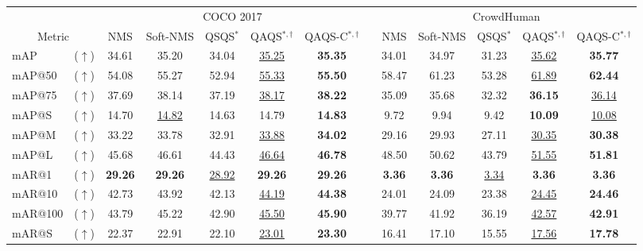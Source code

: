 \begin{table*}
    \centering
    \begin{tabular}{l r ccccc c ccccc}
    \toprule
     & & \multicolumn{5}{c}{COCO 2017}& & \multicolumn{5}{c}{CrowdHuman} \\
    \cmidrule(lr){3-7}
    \cmidrule(lr){9-13}
    \multicolumn{2}{c}{Metric} & NMS & Soft-NMS & QSQS$^{*}$ & QAQS$^{*,\dag}$ & QAQS-C$^{*,\dag}$ && NMS & Soft-NMS & QSQS$^{*}$ & QAQS$^{*,\dag}$ & QAQS-C$^{*,\dag}$ \\
    \cmidrule(lr){1-2}
    \cmidrule(lr){3-7}
    \cmidrule(lr){9-13}
    mAP        & ($\uparrow$) & 34.61 & 35.20 & 34.04 & \underline{35.25} & \textbf{35.35} && 34.01 & 34.97 & 31.23 & \underline{35.62} & \textbf{35.77} \\
    mAP@50     & ($\uparrow$) & 54.08 & 55.27 & 52.94 & \underline{55.33} & \textbf{55.50} && 58.47 & 61.23 & 53.28 & \underline{61.89} & \textbf{62.44} \\
    mAP@75     & ($\uparrow$) & 37.69 & 38.14 & 37.19 & \underline{38.17} & \textbf{38.22}& & 35.09 & 35.68 & 32.32 & \textbf{36.15} & \underline{36.14} \\
    mAP@S  & ($\uparrow$)     & 14.70 & \underline{14.82} & 14.63 & 14.79 & \textbf{14.83} &&  9.72 &  9.94 &  9.42 & \textbf{10.09} & \underline{10.08} \\
    mAP@M & ($\uparrow$)      & 33.22 & 33.78 & 32.91 & \underline{33.88} & \textbf{34.02} && 29.16 & 29.93 & 27.11 & \underline{30.35} & \textbf{30.38} \\
    mAP@L  & ($\uparrow$)     & 45.68 & 46.61 & 44.43 & \underline{46.64} & \textbf{46.78} && 48.50 & 50.62 & 43.79 & \underline{51.55} & \textbf{51.81} \\
    \cmidrule(lr){1-2}
    \cmidrule(lr){3-7}
    \cmidrule(lr){9-13}
    mAR@1      & ($\uparrow$) & \textbf{29.26} & \textbf{29.26} & \underline{28.92} & \textbf{29.26} & \textbf{29.26} &  &\textbf{3.36} &  \textbf{3.36} &  \underline{3.34} &  \textbf{3.36} & \textbf{ 3.36} \\
    mAR@10     & ($\uparrow$) & 42.73 & 43.92 & 42.13 & \underline{44.19} & \textbf{44.38} && 24.01 & 24.09 & 23.38 & \underline{24.45} & \textbf{24.46} \\
    mAR@100    & ($\uparrow$) & 43.79 & 45.22 & 42.90 & \underline{45.50} & \textbf{45.90} && 39.77 & 41.92 & 36.19 & \underline{42.57} & \textbf{42.91} \\
    mAR@S  & ($\uparrow$)     & 22.37 & 22.91 & 22.10 & \underline{23.01} & \textbf{23.30} && 16.41 & 17.10 & 15.55 & \underline{17.56} & \textbf{17.78} \\

\end{tabular}
\end{table*}

